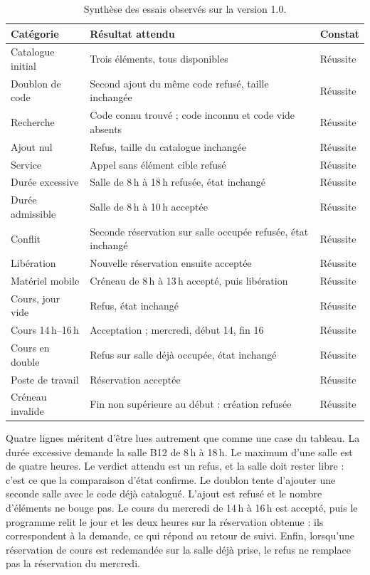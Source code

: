 \documentclass[11pt,a4paper]{article}
\begin{document}
\begin{table}[ht]
\centering
\caption{Synthèse des essais observés sur la version 1.0.}
\label{tab:essais}
\small
\begin{tabularx}{\textwidth}{@{}l X l@{}}
\toprule
Catégorie & Résultat attendu & Constat\\
\midrule
Catalogue initial & Trois éléments, tous disponibles & Réussite\\
Doublon de code & Second ajout du même code refusé, taille inchangée & Réussite\\
Recherche & Code connu trouvé ; code inconnu et code vide absents & Réussite\\
Ajout nul & Refus, taille du catalogue inchangée & Réussite\\
Service & Appel sans élément cible refusé & Réussite\\
Durée excessive & Salle de 8\,h à 18\,h refusée, état inchangé & Réussite\\
Durée admissible & Salle de 8\,h à 10\,h acceptée & Réussite\\
Conflit & Seconde réservation sur salle occupée refusée, état inchangé & Réussite\\
Libération & Nouvelle réservation ensuite acceptée & Réussite\\
Matériel mobile & Créneau de 8\,h à 13\,h accepté, puis libération & Réussite\\
Cours, jour vide & Refus, état inchangé & Réussite\\
Cours 14\,h--16\,h & Acceptation ; mercredi, début 14, fin 16 & Réussite\\
Cours en double & Refus sur salle déjà occupée, état inchangé & Réussite\\
Poste de travail & Réservation acceptée & Réussite\\
Créneau invalide & Fin non supérieure au début : création refusée & Réussite\\
\bottomrule
\end{tabularx}
\end{table}

Quatre lignes méritent d'être lues autrement que comme une case du tableau. La durée excessive demande la salle B12 de 8\,h à 18\,h. Le maximum d'une salle est de quatre heures. Le verdict attendu est un refus, et la salle doit rester libre : c'est ce que la comparaison d'état confirme. Le doublon tente d'ajouter une seconde salle avec le code déjà catalogué. L'ajout est refusé et le nombre d'éléments ne bouge pas. Le cours du mercredi de 14\,h à 16\,h est accepté, puis le programme relit le jour et les deux heures sur la réservation obtenue : ils correspondent à la demande, ce qui répond au retour de suivi. Enfin, lorsqu'une réservation de cours est redemandée sur la salle déjà prise, le refus ne remplace pas la réservation du mercredi.
\end{document}
